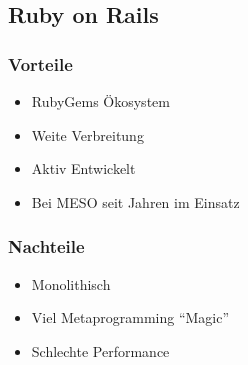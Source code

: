 \subsection{Ruby on Rails}
\label{ssec:el-ruby-on-rails}

\subsubsection{Vorteile}
\label{sssec:elr-vorteile}

\begin{itemize}
	\item RubyGems Ökosystem
	\item Weite Verbreitung
	\item Aktiv Entwickelt
	\item Bei MESO seit Jahren im Einsatz
\end{itemize}

\subsubsection{Nachteile}
\label{sssec:elr-nachteile}

\begin{itemize}
	\item Monolithisch
	\item Viel Metaprogramming \enquote{Magic}
	\item Schlechte Performance
\end{itemize}
